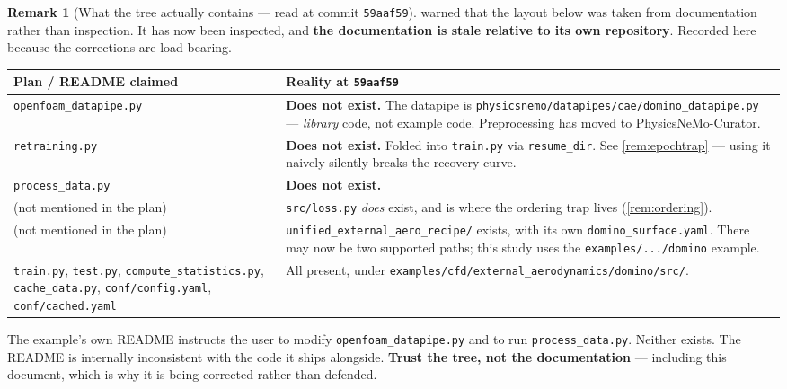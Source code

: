 \documentclass[10pt,a4paper]{article}
\theoremstyle{definition}
\newtheorem{remark}{Remark}[section]
\begin{document}
\begin{remark}[What the tree actually contains --- read at commit \texttt{59aaf59}]
\label{rem:treereality}
 warned that the layout below was taken from documentation rather
than inspection. It has now been inspected, and \textbf{the documentation is stale
relative to its own repository}. Recorded here because the corrections are load-bearing.

\begin{center}\small
\begin{tabular}{@{}p{4.2cm}p{10.8cm}@{}}
\toprule
\textbf{Plan / README claimed} & \textbf{Reality at \texttt{59aaf59}} \\
\midrule
\texttt{openfoam\_datapipe.py}
  & \textbf{Does not exist.} The datapipe is
    \texttt{physicsnemo/datapipes/cae/domino\_datapipe.py} --- \emph{library} code, not
    example code. Preprocessing has moved to PhysicsNeMo-Curator. \\[0.3em]
\texttt{retraining.py}
  & \textbf{Does not exist.} Folded into \texttt{train.py} via \texttt{resume\_dir}.
    See \cref{rem:epochtrap} --- using it naively silently breaks the recovery curve. \\[0.3em]
\texttt{process\_data.py}
  & \textbf{Does not exist.} \\[0.3em]
(not mentioned in the plan)
  & \texttt{src/loss.py} \emph{does} exist, and is where the ordering trap lives
    (\cref{rem:ordering}). \\[0.3em]
(not mentioned in the plan)
  & \texttt{unified\_external\_aero\_recipe/} exists, with its own
    \texttt{domino\_surface.yaml}. There may now be two supported paths; this study uses
    the \texttt{examples/.../domino} example. \\[0.3em]
\texttt{train.py}, \texttt{test.py},
\texttt{compute\_statistics.py},
\texttt{cache\_data.py},
\texttt{conf/config.yaml},
\texttt{conf/cached.yaml}
  & All present, under \texttt{examples/cfd/external\_aerodynamics/domino/src/}. \\
\bottomrule
\end{tabular}
\end{center}

The example's own README instructs the user to modify \texttt{openfoam\_datapipe.py} and
to run \texttt{process\_data.py}. Neither exists. The README is internally inconsistent
with the code it ships alongside. \textbf{Trust the tree, not the documentation} ---
including this document, which is why it is being corrected rather than defended.
\end{remark}
\end{document}
